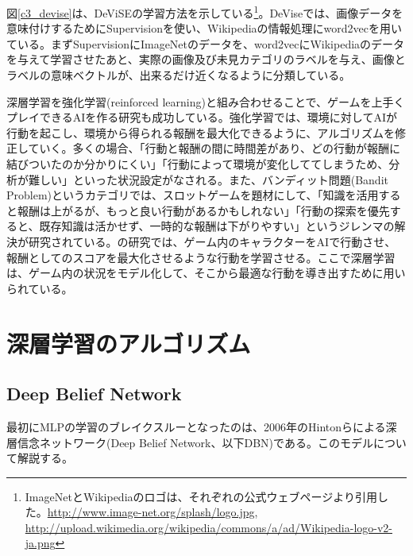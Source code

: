 図\ref{c3_devise}は、DeViSEの学習方法を示している\footnote{ImageNetとWikipediaのロゴは、それぞれの公式ウェブページより引用した。\url{http://www.image-net.org/splash/logo.jpg}, \url{http://upload.wikimedia.org/wikipedia/commons/a/ad/Wikipedia-logo-v2-ja.png}}。DeViseでは、画像データを意味付けするためにSupervisionを使い、Wikipediaの情報処理にword2vecを用いている。まずSupervisionにImageNetのデータを、word2vecにWikipediaのデータを与えて学習させたあと、実際の画像及び未見カテゴリのラベルを与え、画像とラベルの意味ベクトルが、出来るだけ近くなるように分類している。\par
深層学習を強化学習(reinforced learning)と組み合わせることで、ゲームを上手くプレイできるAIを作る研究も成功している\cite{mnih2013playing}。強化学習では、環境に対してAIが行動を起こし、環境から得られる報酬を最大化できるように、アルゴリズムを修正していく。多くの場合、「行動と報酬の間に時間差があり、どの行動が報酬に結びついたのか分かりにくい」「行動によって環境が変化しててしまうため、分析が難しい」といった状況設定がなされる。また、バンディット問題(Bandit Problem)というカテゴリでは、スロットゲームを題材にして、「知識を活用すると報酬は上がるが、もっと良い行動があるかもしれない」「行動の探索を優先すると、既存知識は活かせず、一時的な報酬は下がりやすい」というジレンマの解決が研究されている\cite{cesa-bianchi2013a-gang}。\cite{mnih2013playing}の研究では、ゲーム内のキャラクターをAIで行動させ、報酬としてのスコアを最大化させるような行動を学習させる。ここで深層学習は、ゲーム内の状況をモデル化して、そこから最適な行動を導き出すために用いられている。

\section{深層学習のアルゴリズム}
\subsection{Deep Belief Network}
最初にMLPの学習のブレイクスルーとなったのは、2006年のHintonらによる深層信念ネットワーク(Deep Belief Network、以下DBN)\cite{hinton2006a-fast, hinton2006reducing}である。このモデルについて解説する。
